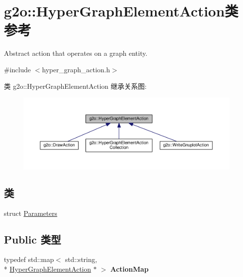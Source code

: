 \hypertarget{classg2o_1_1HyperGraphElementAction}{\section{g2o\-:\-:Hyper\-Graph\-Element\-Action类 参考}
\label{classg2o_1_1HyperGraphElementAction}
}


Abstract action that operates on a graph entity.  




{\ttfamily \#include $<$hyper\-\_\-graph\-\_\-action.\-h$>$}



类 g2o\-:\-:Hyper\-Graph\-Element\-Action 继承关系图\-:
\nopagebreak
\begin{figure}[H]
\begin{center}
\leavevmode
\includegraphics[width=350pt]{classg2o_1_1HyperGraphElementAction__inherit__graph}
\end{center}
\end{figure}
\subsection*{类}
\begin{DoxyCompactItemize}
\item 
struct \hyperlink{structg2o_1_1HyperGraphElementAction_1_1Parameters}{Parameters}
\end{DoxyCompactItemize}
\subsection*{Public 类型}
\begin{DoxyCompactItemize}
\item 
\hypertarget{classg2o_1_1HyperGraphElementAction_abc889fc90ae1bbb63d90c7993777417a}{typedef std\-::map$<$ std\-::string, \\*
\hyperlink{classg2o_1_1HyperGraphElementAction}{Hyper\-Graph\-Element\-Action} $\ast$ $>$ {\bfseries Action\-Map}}\label{classg2o_1_1HyperGraphElementAction_abc889fc90ae1bbb63d90c7993777417a}

\end{DoxyCompactItemize}
